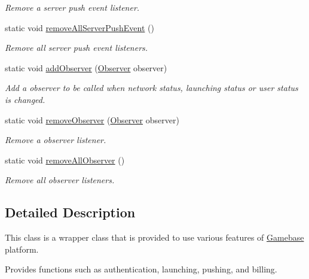 \begin{DoxyCompactItemize}
\begin{DoxyCompactList}\small\item\em Remove a server push event listener. \end{DoxyCompactList}\item 
static void \hyperlink{classcom_1_1toast_1_1android_1_1gamebase_1_1_gamebase_ad8565e3001614780831e6f05fa3f9e77}{remove\+All\+Server\+Push\+Event} ()
\begin{DoxyCompactList}\small\item\em Remove all server push event listeners. \end{DoxyCompactList}\item 
static void \hyperlink{classcom_1_1toast_1_1android_1_1gamebase_1_1_gamebase_a9079ec835df5660d8b19a1fd3eb0d9d8}{add\+Observer} (\hyperlink{interfacecom_1_1toast_1_1android_1_1gamebase_1_1observer_1_1_observer}{Observer} observer)
\begin{DoxyCompactList}\small\item\em Add a observer to be called when network status, launching status or user status is changed. \end{DoxyCompactList}\item 
static void \hyperlink{classcom_1_1toast_1_1android_1_1gamebase_1_1_gamebase_af13c08393910fc1b5dac3b5209f461c8}{remove\+Observer} (\hyperlink{interfacecom_1_1toast_1_1android_1_1gamebase_1_1observer_1_1_observer}{Observer} observer)
\begin{DoxyCompactList}\small\item\em Remove a observer listener. \end{DoxyCompactList}\item 
static void \hyperlink{classcom_1_1toast_1_1android_1_1gamebase_1_1_gamebase_a73db608847a6f59086a19b7be9fb0b7f}{remove\+All\+Observer} ()
\begin{DoxyCompactList}\small\item\em Remove all observer listeners. \end{DoxyCompactList}\end{DoxyCompactItemize}


\subsection{Detailed Description}
This class is a wrapper class that is provided to use various features of \hyperlink{classcom_1_1toast_1_1android_1_1gamebase_1_1_gamebase}{Gamebase} platform. 

Provides functions such as authentication, launching, pushing, and billing. 

